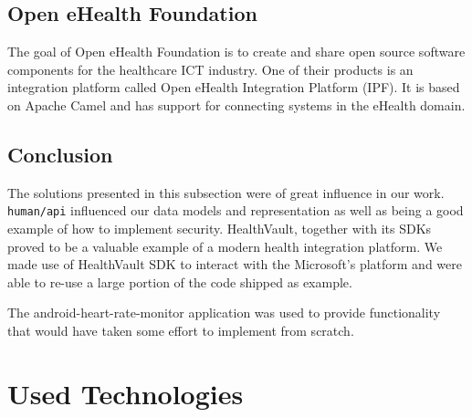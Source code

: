 
\subsection{Open eHealth Foundation}

The goal of Open eHealth Foundation is to create and share open source software components for the healthcare ICT industry.
One of their products is an integration platform called Open eHealth Integration Platform (IPF).
It is based on Apache Camel and has support for connecting systems in the eHealth domain. \cite{OpenEHealthFoundation}


\subsection{Conclusion}

The solutions presented in this subsection were of great influence in our work.
\verb|human/api| influenced our data models and representation as well as being a good example of how to implement security.
HealthVault, together with its SDKs proved to be a valuable example of a modern health integration platform.
We made use of HealthVault SDK to interact with the Microsoft's platform and were able to re-use a large portion of the code shipped as example.

The android-heart-rate-monitor application was used to provide functionality that would have taken some effort to implement from scratch.


\section{Used Technologies}
\label{section:used-technologies}


